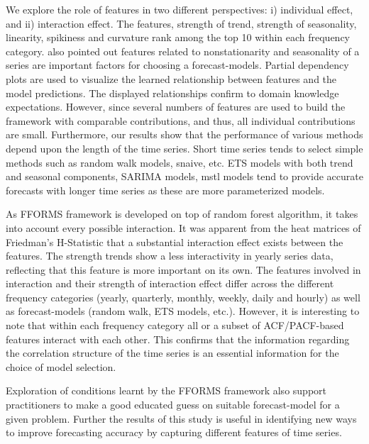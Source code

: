 \documentclass[11pt,a4paper,]{article}
\begin{document}
We explore the role of features in two different perspectives: i)
individual effect, and ii) interaction effect. The features, strength of
trend, strength of seasonality, linearity, spikiness and curvature rank
among the top 10 within each frequency category.
\textcite{lemke2010meta} also pointed out features related to
nonstationarity and seasonality of a series are important factors for
choosing a forecast-models. Partial dependency plots are used to
visualize the learned relationship between features and the model
predictions. The displayed relationships confirm to domain knowledge
expectations. However, since several numbers of features are used to
build the framework with comparable contributions, and thus, all
individual contributions are small. Furthermore, our results show that
the performance of various methods depend upon the length of the time
series. Short time series tends to select simple methods such as random
walk models, snaive, etc. ETS models with both trend and seasonal
components, SARIMA models, mstl models tend to provide accurate
forecasts with longer time series as these are more parameterized
models.

As FFORMS framework is developed on top of random forest algorithm, it
takes into account every possible interaction. It was apparent from the
heat matrices of Friedman's H-Statistic that a substantial interaction
effect exists between the features. The strength trends show a less
interactivity in yearly series data, reflecting that this feature is
more important on its own. The features involved in interaction and
their strength of interaction effect differ across the different
frequency categories (yearly, quarterly, monthly, weekly, daily and
hourly) as well as forecast-models (random walk, ETS models, etc.).
However, it is interesting to note that within each frequency category
all or a subset of ACF/PACF-based features interact with each other.
This confirms that the information regarding the correlation structure
of the time series is an essential information for the choice of model
selection.

Exploration of conditions learnt by the FFORMS framework also support
practitioners to make a good educated guess on suitable forecast-model
for a given problem. Further the results of this study is useful in
identifying new ways to improve forecasting accuracy by capturing
different features of time series.

\printbibliography[title=References]
\end{document}
